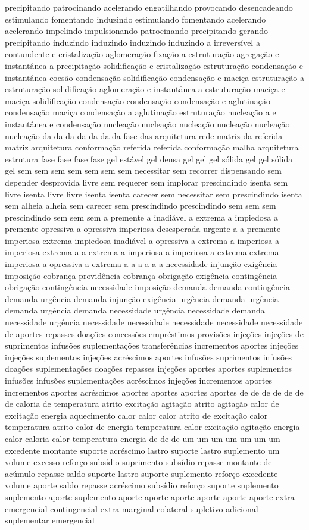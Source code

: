 precipitando patrocinando acelerando engatilhando provocando desencadeando estimulando fomentando induzindo estimulando fomentando acelerando acelerando impelindo impulsionando patrocinando precipitando gerando precipitando induzindo induzindo induzindo induzindo a irreversível a contundente e cristalização aglomeração fixação a estruturação agregação e instantânea a precipitação solidificação e cristalização estruturação condensação e instantânea coesão condensação solidificação condensação e maciça estruturação a estruturação solidificação aglomeração e instantânea a estruturação maciça e maciça solidificação condensação condensação condensação e aglutinação condensação maciça condensação a aglutinação estruturação nucleação a e instantânea e condensação nucleação nucleação nucleação nucleação nucleação nucleação da da da da da da da fase das arquitetura rede matriz da referida matriz arquitetura conformação referida referida conformação malha arquitetura estrutura fase fase fase fase gel estável gel densa gel gel gel sólida gel gel sólida gel sem sem sem sem sem sem sem necessitar sem recorrer dispensando sem depender desprovida livre sem requerer sem implorar prescindindo isenta sem livre isenta livre livre isenta isenta carecer sem necessitar sem prescindindo isenta sem alheia alheia sem carecer sem prescindindo prescindindo sem sem sem prescindindo sem sem sem a premente a inadiável a extrema a impiedosa a premente opressiva a opressiva imperiosa desesperada urgente a a premente imperiosa extrema impiedosa inadiável a opressiva a extrema a imperiosa a imperiosa extrema a a extrema a imperiosa a imperiosa a extrema extrema imperiosa a opressiva a extrema a a a a a a necessidade injunção exigência imposição cobrança providência cobrança obrigação exigência contingência obrigação contingência necessidade imposição demanda demanda contingência demanda urgência demanda injunção exigência urgência demanda urgência demanda urgência demanda necessidade urgência necessidade demanda necessidade urgência necessidade necessidade necessidade necessidade necessidade de aportes repasses doações concessões empréstimos provisões injeções injeções de suprimentos infusões suplementações transferências incrementos aportes injeções injeções suplementos injeções acréscimos aportes infusões suprimentos infusões doações suplementações doações repasses injeções aportes aportes suplementos infusões infusões suplementações acréscimos injeções incrementos aportes incrementos aportes acréscimos aportes aportes aportes aportes de de de de de de de caloria de temperatura atrito excitação agitação atrito agitação calor de excitação energia aquecimento calor calor calor atrito de excitação calor temperatura atrito calor de energia temperatura calor excitação agitação energia calor caloria calor temperatura energia de de de um um um um um um um excedente montante suporte acréscimo lastro suporte lastro suplemento um volume excesso reforço subsídio suprimento subsídio repasse montante de acúmulo repasse saldo suporte lastro suporte suplemento reforço excedente volume aporte saldo repasse acréscimo subsídio reforço suporte suplemento suplemento aporte suplemento aporte aporte aporte aporte aporte aporte extra emergencial contingencial extra marginal colateral supletivo adicional suplementar emergencial 
